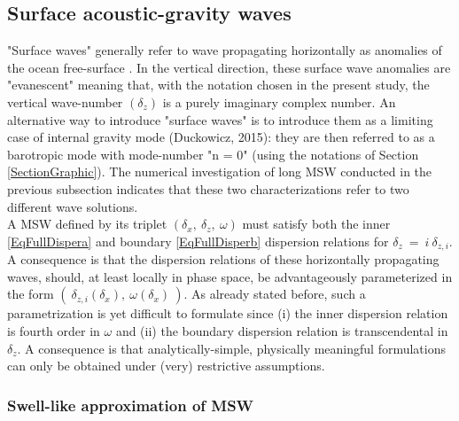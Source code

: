 \documentclass[a4paper,11pt]{article}
\begin{document}
\subsection{Surface acoustic-gravity waves}
\label{SubSectionGraphicMSW}
"Surface waves" generally refer to wave propagating horizontally as anomalies of the ocean free-surface \cite{gill_1982}. In the vertical direction, these surface wave anomalies are "evanescent" meaning that, with the notation chosen in the present study, the vertical wave-number $(\delta_z)$ is a purely imaginary complex number. An alternative way to introduce "surface waves" is to introduce them as a limiting case of internal gravity mode (Duckowicz, 2015): they are then referred to as a barotropic mode with mode-number "n = 0" (using the notations of Section \ref{SectionGraphic}). The numerical investigation of long MSW conducted in the previous subsection indicates that these two characterizations refer to two different wave solutions.\\
A MSW defined by its triplet $(\delta_x,\ \delta_z,\ \omega)$ must satisfy both the inner \ref{EqFullDispera} and boundary \ref{EqFullDisperb} dispersion relations for $\delta_z\ =\ i\ \delta_{z,i}$. A consequence is that the dispersion relations of these horizontally propagating waves, should, at least locally in phase space, be advantageously parameterized in the form $(\ \delta_{z,i}(\delta_x),\ \omega(\delta_x)\ )$. As already stated before, such a parametrization is yet difficult to formulate since (i) the inner dispersion relation is fourth order in $\omega$ and (ii) the boundary dispersion relation is transcendental in $\delta_z$. A consequence is that analytically-simple, physically meaningful formulations can only be obtained under (very) restrictive assumptions.\\ 

\subsubsection{Swell-like approximation of MSW}
\end{document}
